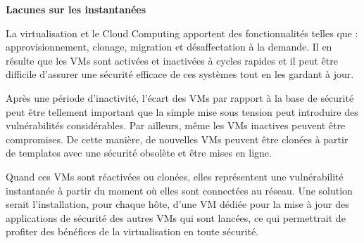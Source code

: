 \textbf{Lacunes sur les instantanées}

La virtualisation et le Cloud Computing apportent des fonctionnalités telles que : approvisionnement, clonage, migration et désaffectation à la demande. Il en résulte que les VMs sont activées et inactivées à cycles rapides et il peut être difficile d'assurer une sécurité efficace de ces systèmes tout en les gardant à jour.

Après une période d'inactivité, l'écart des VMs par rapport à la base de sécurité peut être tellement important que la simple mise sous tension peut introduire des vulnérabilités considérables. Par ailleurs, même les VMs inactives peuvent être compromises. De cette manière, de nouvelles VMs peuvent être clonées à partir de templates avec une sécurité obsolète et être mises en ligne.

Quand ces VMs sont réactivées ou clonées, elles représentent une vulnérabilité instantanée à partir du moment où elles sont connectées au réseau. Une solution serait l'installation,  pour chaque hôte, d'une VM dédiée pour la mise à jour des applications de sécurité des autres VMs qui sont lancées, ce qui permettrait de profiter des bénéfices de la virtualisation en toute sécurité. 

